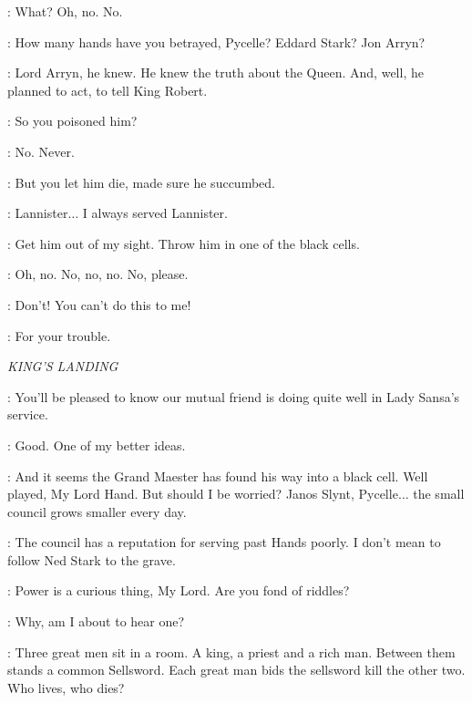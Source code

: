 
\PYCELLE: What? Oh, no. No. 


\TYRION: How many hands have you betrayed, Pycelle? Eddard Stark? Jon Arryn? 

\PYCELLE: Lord Arryn, he knew. He knew the truth about the Queen. And, well, he planned to act, to tell King Robert. 

\TYRION: So you poisoned him? 

\PYCELLE: No. Never. 

\TYRION: But you let him die, made sure he succumbed. 

\PYCELLE: Lannister$\ldots$ I always served Lannister. 

\TYRION: Get him out of my sight. Throw him in one of the black cells. 

\PYCELLE: Oh, no. No, no, no. No, please. 


\PYCELLE: Don't! You can't do this to me! 


\TYRION: For your trouble. 


\scene

\textit{KING'S LANDING}


\VARYS: You'll be pleased to know our mutual friend is doing quite well in Lady Sansa's service. 

\TYRION: Good. One of my better ideas. 

\VARYS: And it seems the Grand Maester has found his way into a black cell. Well played, My Lord Hand. But should I be worried? Janos Slynt, Pycelle$\ldots$ the small council grows smaller every day. 

\TYRION: The council has a reputation for serving past Hands poorly. I don't mean to follow Ned Stark to the grave. 

\VARYS: Power is a curious thing, My Lord. Are you fond of riddles? 

\TYRION: Why, am I about to hear one? 

\VARYS: Three great men sit in a room. A king, a priest and a rich man. Between them stands a common Sellsword. Each great man bids the sellsword kill the other two. Who lives, who dies? 

